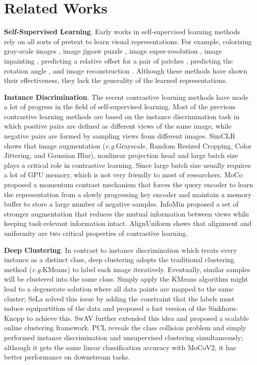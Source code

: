 \documentclass{article}
\newcommand{\<}{\left\langle}
\renewcommand{\>}{\right\rangle}
\newcommand{\eg}{{\emph{e.g.}}}
\begin{document}
 \section{Related Works}
\textbf{Self-Supervised Learning}.
Early works in self-supervised learning methods rely on all sorts of pretext to learn visual representations. For example, colorizing gray-scale images \cite{img_color}, image jigsaw puzzle \cite{jigsaw}, image super-resolution \cite{srgan}, image inpainting \cite{inpainting}, predicting a relative offset for a pair of patches \cite{patch_prediction}, predicting the rotation angle \cite{rotation_selfsup}, and image reconstruction \cite{autoencoder, gan, biggan, bigbigan}. Although these methods have shown their effectiveness, they lack the generality of the learned representations. 

\textbf{Instance Discrimination}.
The recent contrastive learning methods \cite{cpc, cmc, simclr, moco, goodview, pirl, deepinfomax, mochi} have made a lot of progress in the field of self-supervised learning. Most of the previous contrastive learning methods are based on the instance discrimination \cite{instance_discrimination} task in which positive pairs are defined as different views of the same image, while negative pairs are formed by sampling views from different images. SimCLR \cite{simclr, simclrv2} shows that image augmentation (\eg Grayscale, Random Resized Cropping, Color Jittering, and Gaussian Blur), nonlinear projection head and large batch size plays a critical role in contrastive learning. Since large batch size usually requires a lot of GPU memory, which is not very friendly to most of researchers. MoCo \cite{moco, mocov2} proposed a momentum contrast mechanism that forces the query encoder to learn the representation from a slowly progressing key encoder and maintain a memory buffer to store a large number of negative samples. InfoMin \cite{goodview} proposed a set of stronger augmentation that reduces the mutual information between views while keeping task-relevant information intact. AlignUniform \cite{alignment_uniformity} shows that alignment and uniformity are two critical properties of contrastive learning. 

\textbf{Deep Clustering}. 
In contrast to instance discrimination which treats every instance as a distinct class, deep clustering \cite{deepclustering} adopts the traditional clustering method (\eg KMeans) to label each image iteratively. Eventually, similar samples will be clustered into the same class. Simply apply the KMeans algorithm might lead to a degenerate solution where all data points are mapped to the same cluster; SeLa \cite{Self-labelling} solved this issue by adding the constraint that the labels must induce equipartition of the data and proposed a fast version of the Sinkhorn-Knopp to achieve this. SwAV \cite{swav} further extended this idea and proposed a scalable online clustering framework. PCL \cite{PCL} reveals the class collision problem and simply performed instance discrimination and unsupervised clustering simultaneously; although it gets the same linear classification accuracy with MoCoV2, it has better performance on downstream tasks. 
\end{document}
